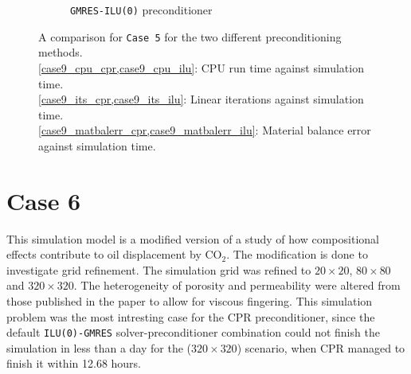 \begin{figure}
\begin{subfigure}{.5\textwidth}
  \caption{\texttt{GMRES-ILU(0)} preconditioner}
	\label{case9_matbalerr_ilu}
\end{subfigure}
\caption[caption]{A comparison for \texttt{Case 5} for the two different preconditioning methods.\\\hspace{\textwidth}
		\cref{case9_cpu_cpr,case9_cpu_ilu}: CPU run time against simulation time. \\\hspace{\textwidth}
		\cref{case9_its_cpr,case9_its_ilu}: Linear iterations against simulation time.\\\hspace{\textwidth}
		\cref{case9_matbalerr_cpr,case9_matbalerr_ilu}: Material balance error against simulation time.}
\label{case9sg}
\end{figure}
\clearpage

\section{Case 6}
This simulation model is a modified version of a study of how compositional effects contribute to oil displacement by CO$_{2}$\supercite{case6paper}.
The modification is done to investigate grid refinement. The simulation grid was refined to $20\times20$, $80\times80$ and $320\times320$.
The heterogeneity of porosity and permeability were altered from those published in the paper to allow for viscous fingering.
This simulation problem was the most intresting case for the CPR preconditioner, since the default \texttt{ILU(0)-GMRES} solver-preconditioner combination
could not finish the simulation in less than a day for the ($320\times320$) scenario, when CPR managed to finish it within 12.68 hours. 

